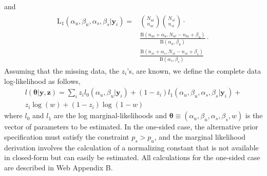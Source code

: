 \documentclass[useAMS,referee,usenatbib]{biom}
\begin{document}
and
\begin{align}
	\begin{split}
\mathrm{L}_1(\alpha_u,\beta_u,\alpha_s,\beta_s|\mathbf{y}_i) 
=&\binom{N_{ui}}{n_{ui}} \binom{N_{si}}{n_{si}}\cdot\\ &\frac{\mathrm{B}(n_{ui}+\alpha_u,N_{ui}-n_{ui}+\beta_u)}{\mathrm{B}(\alpha_u,\beta_u)}\cdot \\ &\frac{\mathrm{B}(n_{si}+\alpha_s,N_{si}-n_{si}+\beta_s)}{\mathrm{B}(\alpha_s,\beta_s)}
\label{model2:unconstrained}
\end{split}
\end{align}
Assuming that the missing data, the $z_i$'s, are known, we define the complete data log-likelihood as follows,
\begin{equation}
\begin{split}
l(\boldsymbol{\theta}|\mathbf{y},\mathbf{z})=\sum_i z_i l_0(\alpha_u, \beta_u|\mathbf{y}_i) +(1-z_i) l_1(\alpha_u, \beta_u, \alpha_s, \beta_s|\mathbf{y}_i)+\\z_i\log(w)+(1-z_i)\log(1-w)\label{eq:cll}
\end{split}
\end{equation}
where $l_0$ and $l_1$ are the log marginal-likelihoods and $\boldsymbol{\theta}\equiv(\alpha_u, \beta_u, \alpha_s,\beta_s, w)$ is the vector of parameters to be estimated. In the one-sided case, the alternative prior specification must satisfy the constraint $p_s>p_u$, and the marginal likelihood derivation involves the calculation of a normalizing constant that is not available in closed-form but can easily be estimated. All calculations for the one-sided case are described in Web Appendix B. 
\end{document}
